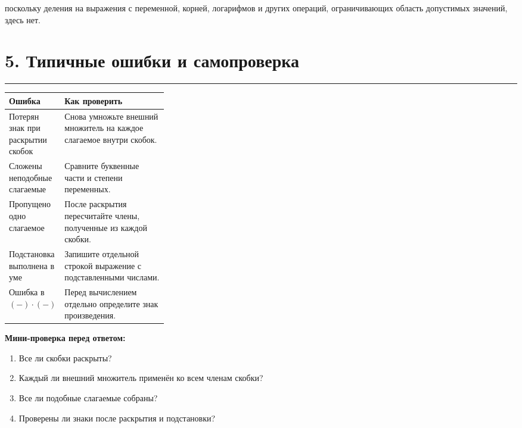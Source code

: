 \documentclass[a4paper,12pt]{article}
\newcommand{\topicline}{%
  \par
  \noindent
  \color{accent}%
  \rule{\linewidth}{0.6pt}%
  \color{black}%
  \par
}
\begin{document}
поскольку деления на выражения с переменной,
корней, логарифмов и других операций,
ограничивающих область допустимых значений,
здесь нет.


\section*{5. Типичные ошибки и самопроверка}
\topicline

\begin{tabularx}
{\linewidth}
{@{}>{\raggedright\arraybackslash}p{0.31\linewidth}X@{}}

\toprule

\textbf{Ошибка}
&
\textbf{Как проверить}
\\

\midrule

Потерян знак при раскрытии скобок
&
Снова умножьте внешний множитель на каждое
слагаемое внутри скобок.
\\

Сложены неподобные слагаемые
&
Сравните буквенные части и степени переменных.
\\

Пропущено одно слагаемое
&
После раскрытия пересчитайте члены,
полученные из каждой скобки.
\\

Подстановка выполнена в уме
&
Запишите отдельной строкой выражение
с подставленными числами.
\\

Ошибка в $(-)\cdot(-)$
&
Перед вычислением отдельно определите
знак произведения.
\\

\bottomrule

\end{tabularx}

\vspace{0.7em}

\textbf{Мини-проверка перед ответом:}

\begin{enumerate}
  \item Все ли скобки раскрыты?

  \item Каждый ли внешний множитель применён
  ко всем членам скобки?

  \item Все ли подобные слагаемые собраны?

  \item Проверены ли знаки после раскрытия
  и подстановки?
\end{enumerate}
\end{document}
